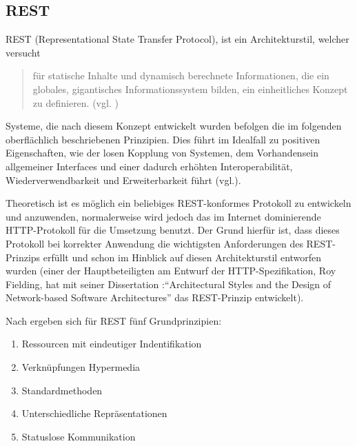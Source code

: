 \subsection{REST}\label{section:rest}
REST (Representational State Transfer Protocol), ist ein Architekturstil, welcher versucht 
\begin{quotation}
für statische Inhalte und dynamisch berechnete Informationen, die ein globales, gigantisches Informationssystem bilden, ein einheitliches Konzept zu definieren. (vgl. \cite{tilkovrestchapter2})
\end{quotation}
Systeme, die nach diesem Konzept entwickelt wurden befolgen die im folgenden oberflächlich beschriebenen Prinzipien. Dies führt im Idealfall zu positiven Eigenschaften, wie der losen Kopplung von Systemen, dem Vorhandensein allgemeiner Interfaces und einer dadurch erhöhten Interoperabilität, Wiederverwendbarkeit und Erweiterbarkeit führt (vgl.\cite{tilkovrestchapter2}).

Theoretisch ist es möglich ein beliebiges REST-konformes Protokoll zu entwickeln und anzuwenden, normalerweise wird jedoch das im Internet dominierende HTTP-Protokoll für die Umsetzung benutzt. Der Grund hierfür ist, dass dieses Protokoll bei korrekter Anwendung die wichtigsten Anforderungen des REST-Prinzips erfüllt und schon im Hinblick auf diesen Architekturstil entworfen wurden (einer der Hauptbeteiligten am Entwurf der HTTP-Spezifikation, Roy Fielding, hat mit seiner Dissertation :"`Architectural Styles and the Design of Network-based Software Architectures"' das REST-Prinzip entwickelt). 

Nach \cite{tilkovrestchapter2} ergeben sich für REST fünf Grundprinzipien:
\begin{enumerate}
 \item\label{enumerate_rest_principles:1} Ressourcen mit eindeutiger Indentifikation
 \item\label{enumerate_rest_principles:2} Verknüpfungen Hypermedia
 \item\label{enumerate_rest_principles:3} Standardmethoden
 \item\label{enumerate_rest_principles:4} Unterschiedliche Repräsentationen
 \item\label{enumerate_rest_principles:5} Statuslose Kommunikation
\end{enumerate}

